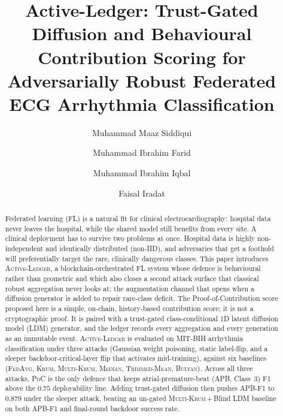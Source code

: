 \documentclass[runningheads]{llncs}
\newcommand{\fedavg}{\textsc{FedAvg}\xspace}
\newcommand{\krum}{\textsc{Krum}\xspace}
\newcommand{\mkrum}{\textsc{Multi-Krum}\xspace}
\newcommand{\median}{\textsc{Median}\xspace}
\newcommand{\tmean}{\textsc{Trimmed-Mean}\xspace}
\newcommand{\bulyan}{\textsc{Bulyan}\xspace}
\newcommand{\poc}{\textsc{PoC}\xspace}
\newcommand{\actledger}{\textsc{Active-Ledger}\xspace}
\newcommand{\bldm}{Blind LDM\xspace}
\begin{document}
\title{Active-Ledger: Trust-Gated Diffusion and
Behavioural Contribution Scoring for Adversarially Robust
Federated ECG Arrhythmia Classification}

\author{ Muhammad Maaz Siddiqui\and
Muhammad Ibrahim Farid\and
Muhammad Ibrahim Iqbal \and
Faisal Iradat}


\maketitle

\begin{abstract}
Federated learning (FL) is a natural fit for clinical electrocardiography:
hospital data never leaves the hospital, while the shared model still
benefits from every site. A clinical deployment has to survive two
problems at once. Hospital data is highly non-independent and identically
distributed (non-IID), and adversaries that
get a foothold will preferentially target the rare, clinically dangerous
classes. This paper introduces \actledger, a blockchain-orchestrated
FL system whose defence is behavioural rather than geometric and
which also closes a second attack surface that classical robust
aggregation never looks at: the augmentation channel that opens when
a diffusion generator is added to repair rare-class deficit. The
Proof-of-Contribution score proposed here is a simple, on-chain,
history-based contribution score; it is not a cryptographic proof.
It is paired with a trust-gated class-conditional 1D latent diffusion
model (LDM) generator, and the ledger records every aggregation and
every generation as an immutable event. \actledger is evaluated on
MIT-BIH arrhythmia classification under three attacks (Gaussian weight
poisoning, static label-flip, and a sleeper backdoor-critical-layer flip
that activates mid-training), against six baselines (\fedavg, \krum,
\mkrum, \median, \tmean, \bulyan). Across all three attacks, \poc is the
only defence that keeps atrial-premature-beat (APB, Class~3) F1 above
the $0.75$ deployability line. Adding trust-gated diffusion then pushes
APB-F1 to $0.879$ under the sleeper attack, beating an un-gated
\mkrum\,+\,\bldm baseline on both APB-F1 and final-round backdoor
success rate.

\end{abstract}
\end{document}
